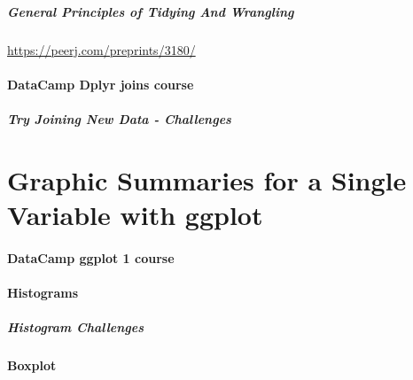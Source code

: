 \documentclass[]{book}
\let\oldparagraph\paragraph
\renewcommand{\paragraph}[1]{\oldparagraph{#1}\mbox{}}
\theoremstyle{definition}
\theoremstyle{definition}
\theoremstyle{definition}
\theoremstyle{remark}
\begin{document}
\hypertarget{general-principles-of-tidying-and-wrangling}{%
\paragraph{General Principles of Tidying And
Wrangling}\label{general-principles-of-tidying-and-wrangling}}

\url{https://peerj.com/preprints/3180/}

\hypertarget{datacamp-dplyr-joins-course}{%
\subsubsection{DataCamp Dplyr joins
course}\label{datacamp-dplyr-joins-course}}

\hypertarget{try-joining-new-data---challenges}{%
\paragraph{Try Joining New Data -
Challenges}\label{try-joining-new-data---challenges}}

\hypertarget{graphic-summaries-for-a-single-variable-with-ggplot}{%
\chapter{Graphic Summaries for a Single Variable with
ggplot}\label{graphic-summaries-for-a-single-variable-with-ggplot}}

\hypertarget{datacamp-ggplot-1-course}{%
\subsubsection{DataCamp ggplot 1
course}\label{datacamp-ggplot-1-course}}

\hypertarget{histograms-1}{%
\subsubsection{Histograms}\label{histograms-1}}

\hypertarget{histogram-challenges}{%
\paragraph{Histogram Challenges}\label{histogram-challenges}}

\hypertarget{boxplot}{%
\subsubsection{Boxplot}\label{boxplot}}
\end{document}
